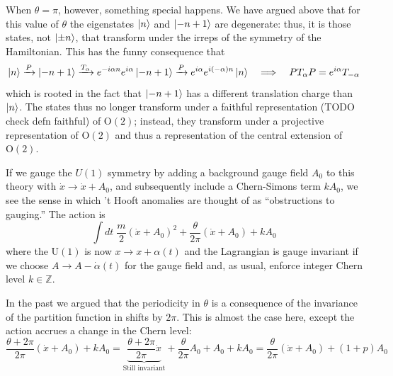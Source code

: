 \documentclass{report}
\begin{document}
When $ \theta=\pi $, however, something special happens. We have argued above 
that for this value of $ \theta $ the eigenstates $ \ket{n} $ and $ \ket{-n+1} $
are degenerate: thus, it is those states, not $ \ket{\pm n} $, that transform 
under the irreps of the symmetry of the Hamiltonian. This has the funny 
consequence that 
\begin{equation*}
	\ket{n} 
	\xrightarrow{P} \ket{-n + 1} 
	\xrightarrow{T_\alpha} e^{-i\alpha n} e^{i \alpha}\ket{-n+1}
	\xrightarrow{P} e^{i\alpha} e^{i(-\alpha) n}\ket{n}
	\quad \Longrightarrow  \quad 
	P T_{\alpha} P = e^{i\alpha} T_{-\alpha}
\end{equation*}
which is rooted in the fact that $ \ket{-n + 1} $ has a different translation 
charge than $ \ket{n} $. The states thus no longer transform under a 
faithful representation (TODO check defn faithful) of $ \text{O}(2) $; 
instead, they transform under a projective representation of $ \text{O}(2) $
and thus a representation of the central extension of $ \text{O}(2) $. 

If we gauge the $ U(1) $ symmetry by adding a background gauge field $ A_0 $ to
this theory with $ \dot{x} \rightarrow \dot{x} + A_0 $, and subsequently include
a Chern-Simons term $ kA_0 $, we see the sense in which 't Hooft anomalies 
are thought of as ``obstructions to gauging.'' The action is 
\begin{equation*}
	\int dt \; \frac{m}{2}(\dot{x} + A_0)^2 
		+ \frac{\theta}{2\pi}(\dot{x} + A_0) + k A_0
\end{equation*}
where the $ \text{U}(1) $ is now $ x \rightarrow x + \alpha(t) $ and the 
Lagrangian is gauge invariant if we choose $ A \rightarrow A - \dot{\alpha}(t) $
for the gauge field and, as usual, enforce integer Chern level $ k\in
\mathbb{Z}$. 

In the past we argued that the periodicity in $ \theta $ is a consequence of 
the invariance of the partition function in shifts by $ 2\pi $. This is almost 
the case here, except the action accrues a change in the Chern level: 
\begin{equation*}
	 \frac{\theta+ 2\pi}{2\pi}(\dot{x} + A_0)
		+ kA_0
	= \underbrace{\frac{\theta+ 2\pi}{2\pi}\dot{x}}_{\text{Still invariant}}
		+ \frac{\theta}{2\pi}A_0 + A_0 + k A_0
	= \frac{\theta}{2\pi}(\dot{x} + A_0) + (1+p)A_0
\end{equation*}
\end{document}

